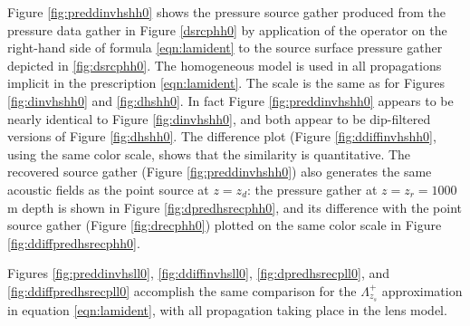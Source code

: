 Figure \ref{fig:preddinvhshh0} shows the pressure source gather
produced from the pressure data gather in Figure \ref{dsrcphh0} by
application of the operator on the right-hand side of formula
\ref{eqn:lamident} to the source surface pressure gather depicted in
\ref{fig:dsrcphh0}. The homogeneous model is used in all propagations
implicit in the prescription \ref{eqn:lamident}. The scale is the same
as for Figures \ref{fig:dinvhshh0} and \ref{fig:dhshh0}. In fact
Figure \ref{fig:preddinvhshh0} appears to be nearly identical to
Figure \ref{fig:dinvhshh0}, and both appear to be dip-filtered
versions of Figure \ref{fig:dhshh0}. The difference plot (Figure
  \ref{fig:ddiffinvhshh0}, using the same color scale, shows that the
  similarity is quantitative. The recovered source gather (Figure
  \ref{fig:preddinvhshh0}) also generates the same acoustic fields as
  the point source at $z=z_d$: the pressure gather at $z=z_r=1000$ m
  depth is shown in Figure \ref{fig:dpredhsrecphh0}, and its
  difference with the point source gather (Figure \ref{fig:drecphh0})
  plotted on the same color scale in Figure
  \ref{fig:ddiffpredhsrecphh0}.

Figures \ref{fig:preddinvhsll0}, \ref{fig:ddiffinvhsll0},
\ref{fig:dpredhsrecpll0}, and \ref{fig:ddiffpredhsrecpll0} accomplish
the same comparison for the $\Lambda^+_{z_s}$ approximation in
equation \ref{eqn:lamident}, with all propagation taking place in the
lens model.

